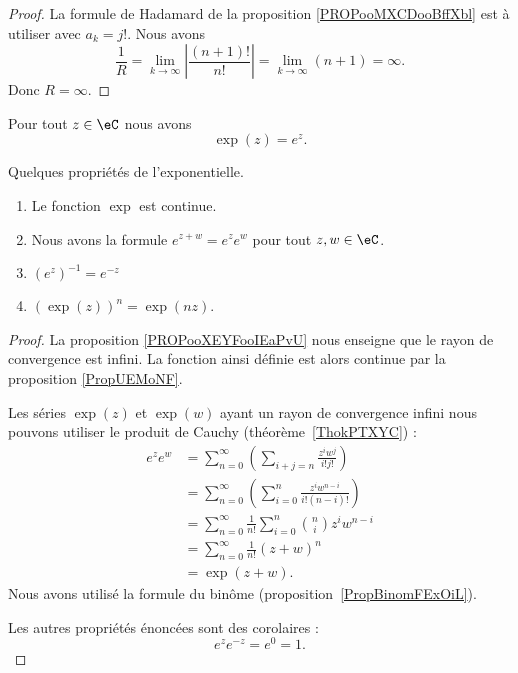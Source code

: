 \begin{proof}
	La formule de Hadamard de la proposition \ref{PROPooMXCDooBffXbl} est à utiliser avec \( a_k=j!\). Nous avons
	\begin{equation}
		\frac{1}{ R }=\lim_{k\to \infty} \left| \frac{ (n+1)! }{ n! } \right| =\lim_{k\to \infty} (n+1)=\infty.
	\end{equation}
	Donc \( R=\infty\).
\end{proof}

\begin{proposition}     \label{PROPooWSDKooJREQGk}
	Pour tout \( z\in \eC\) nous avons
	\begin{equation}
		\exp(z)= e^{z}.
	\end{equation}
\end{proposition}

\begin{proposition}     \label{PropdDjisy}
	Quelques propriétés de l'exponentielle.
	\begin{enumerate}
		\item
		      Le fonction \( \exp\) est continue.
		\item       \label{ITEMooRLHCooJTuYKV}
		      Nous avons la formule \(  e^{z+w}= e^{z}e^w\) pour tout \( z,w\in \eC\).
		\item
		      \( (e^z)^{-1}= e^{-z}\)
		\item       \label{ITEMooIFYFooUniuKS}
		      \( (\exp(z))^n=\exp(nz)\).
	\end{enumerate}
\end{proposition}

\begin{proof}
	La proposition \ref{PROPooXEYFooIEaPvU} nous enseigne que le rayon de convergence est infini. La fonction ainsi définie est alors continue par la proposition \ref{PropUEMoNF}.

	Les séries \( \exp(z)\) et \( \exp(w)\) ayant un rayon de convergence infini nous pouvons utiliser le produit de Cauchy (théorème~\ref{ThokPTXYC}) :
	\begin{subequations}
		\begin{align}
			e^{z} e^{w} & =\sum_{n=0}^{\infty}\left( \sum_{i+j=n}\frac{ z^iw^j }{ i!j! } \right)         \\
			            & =\sum_{n=0}^{\infty}\left( \sum_{i=0}^n\frac{ z^iw^{n-i} }{ i!(n-i)! } \right) \\
			            & =\sum_{n=0}^{\infty}\frac{1}{ n! }\sum_{i=0}^{n}{n\choose i}z^iw^{n-i}         \\
			            & =\sum_{n=0}^{\infty}\frac{1}{ n! }(z+w)^{n}                                    \\
			            & =\exp(z+w).
		\end{align}
	\end{subequations}
	Nous avons utilisé la formule du binôme (proposition~\ref{PropBinomFExOiL}).

	Les autres propriétés énoncées sont des corolaires :
	\begin{equation}
		e^{z} e^{-z}= e^{0}=1.
	\end{equation}
\end{proof}


